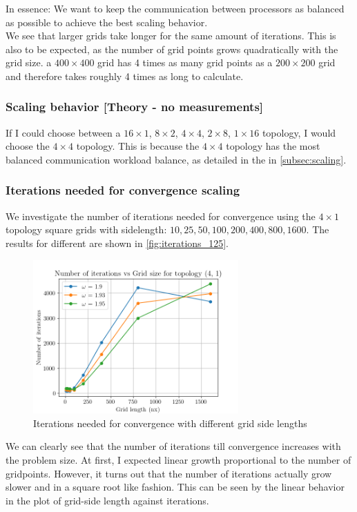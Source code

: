In essence: We want to keep the communication between processors as balanced as possible to achieve the best scaling behavior.
\\
We see that larger grids take longer for the same amount of iterations. This is also to be expected, as the number of grid points grows quadratically with the grid size. a $400 \times 400$ grid has 4 times as many grid points as a $200 \times 200$ grid and therefore takes roughly 4 times as long to calculate. 


\subsubsection{Scaling behavior [Theory - no measurements]}
If I could choose between a $16 \times 1$, $8 \times 2$, $4 \times4$, $2 \times 8$, $1 \times 16$ topology, I would choose the $4 \times 4$ topology. This is because the $4 \times 4$ topology has the most balanced communication workload balance, as detailed in the  in \autoref{subsec:scaling}.

\subsubsection{Iterations needed for convergence scaling}
We investigate the number of iterations needed for convergence using the $4 \times 1$ topology square grids with sidelength: $10, 25, 50, 100, 200, 400, 800, 1600$. The results for different \Shining{$\omega$} are shown in \autoref{fig:iterations_125}.

\begin{figure}[H]
    \centering
    \includegraphics[width=0.7\textwidth]{../fig/lab1/iteration_count_(4, 1)_125.png}
    \caption{Iterations needed for convergence with different grid side lengths}
    \label{fig:iterations_125}
\end{figure}
We can clearly see that the number of iterations till convergence increases with the problem size. At first, I expected linear growth proportional to the number of gridpoints. However, it turns out that the number of iterations actually grow slower and in a square root like fashion. This can be seen by the linear behavior in the plot of grid-side length against iterations. 

